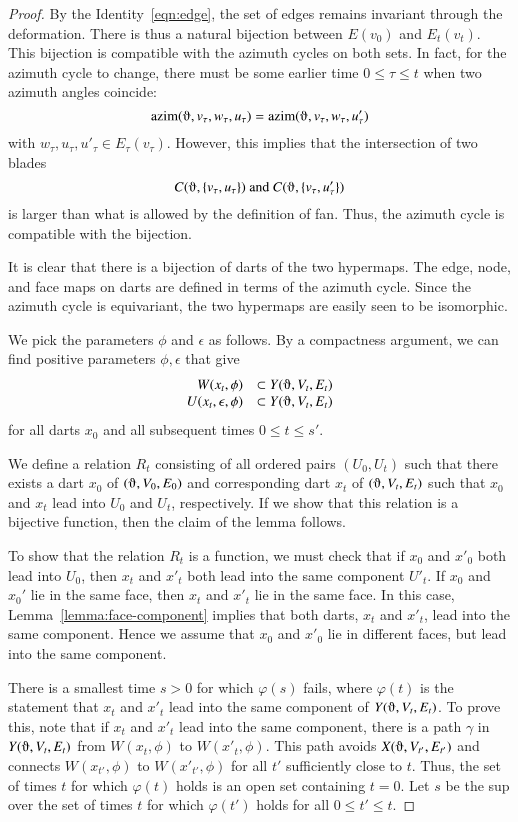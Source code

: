 \begin{proof} By the Identity~\ref{eqn:edge}, the set of
edges remains invariant through the deformation.  There
is thus a natural bijection between $E(v_0)$ and $E_t(v_t)$.
This bijection is compatible with the azimuth cycles on both
sets.  In fact, for the azimuth cycle to change, there must
be some earlier time $0\le\tau \le t$ when two azimuth angles coincide:
$$\op{azim}(\orgn,v_\tau,w_\tau,u_\tau) = \op{azim}(\orgn,v_\tau,w_\tau,u'_\tau)$$
with $w_\tau,u_\tau,u'_\tau\in E_\tau(v_\tau)$.  However, this
implies that the intersection of two blades 
   $$
   C(\orgn,\{v_\tau,u_\tau\}) \text{ and } C(\orgn,\{v_\tau,u'_\tau\})
   $$
is larger than what is allowed by the definition of fan.  Thus,
the azimuth cycle is compatible with the bijection.

It is clear that there is a bijection of darts of the two
hypermaps.   The edge, node, and face maps on darts are defined
in terms of the azimuth cycle.  Since the azimuth cycle is
equivariant, the two hypermaps are easily seen to be isomorphic.

We pick the parameters $\phi$ and $\epsilon$ as follows.
By a compactness argument, we can find positive parameters
$\phi,\epsilon$ that give 
   $$
   \begin{array}{rll}
   W(x_t,\phi)&\subset Y(\orgn,V_t,E_t)\\
   U(x_t,\epsilon,\phi)&\subset Y(\orgn,V_t,E_t)
   \end{array}
   $$
for all darts $x_0$ and all subsequent times $0\le t\le s'$.

We define a relation $R_t$ consisting of all ordered pairs $(U_0,U_t)$
such that there exists a dart $x_0$ of $(\orgn,V_0,E_0)$ and 
corresponding dart $x_t$ of $(\orgn,V_t,E_t)$ such that $x_0$
and $x_t$ lead into $U_0$ and $U_t$, respectively.  If we show
that this relation is a bijective function, then the claim
of the lemma follows.

To show that the relation $R_t$ is a function, we must check that
if $x_0$ and $x'_0$ both lead into $U_0$, then $x_t$ and $x'_t$
both lead into the same component $U'_t$.  If $x_0$ and $x_0'$
lie in the same face, then $x_t$ and $x'_t$ lie in the same face.
In this case, Lemma~\ref{lemma:face-component} 
implies that both darts, $x_t$
and $x'_t$, lead into the same component. 
Hence we assume that $x_0$ and $x'_0$ lie in different faces, but lead
into the same component.  

There is a smallest time
$s>0$ for which $\varphi(s)$ fails, where 
 $\varphi(t)$ is the statement that $x_t$ and $x'_t$ lead
into the same component of $Y(\orgn,V_t,E_t)$.
To prove this, note that 
if $x_t$ and $x'_t$ lead into the same component, there is
a path $\gamma$ in $Y(\orgn,V_t,E_t)$
from $W(x_t,\phi)$ to $W(x'_t,\phi)$.  This path avoids 
$X(\orgn,V_{t'},E_{t'})$ and connects $W(x_{t'},\phi)$ to
$W(x'_{t'},\phi)$ for all $t'$ sufficiently close to $t$.
Thus, the set of times $t$ for which $\varphi(t)$ holds is an
open set containing $t=0$.  Let $s$ be the sup over the set of
times $t$ for which $\varphi(t')$ holds for all $0\le t'\le t$.


\end{proof}
